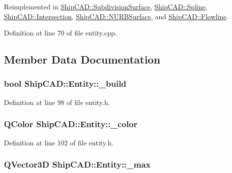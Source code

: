 Reimplemented in \hyperlink{classShipCAD_1_1SubdivisionSurface_aec5073750762d1f8c3ab2107a742f4a5}{Ship\-C\-A\-D\-::\-Subdivision\-Surface}, \hyperlink{classShipCAD_1_1Spline_a6e932411f0f4463514f80011c58f5e6a}{Ship\-C\-A\-D\-::\-Spline}, \hyperlink{classShipCAD_1_1Intersection_a2b496f9ab21c5fc4a7b97a665b24f2b1}{Ship\-C\-A\-D\-::\-Intersection}, \hyperlink{classShipCAD_1_1NURBSurface_aa6fc3d060087593349ce1b5119419433}{Ship\-C\-A\-D\-::\-N\-U\-R\-B\-Surface}, and \hyperlink{classShipCAD_1_1Flowline_ad148400a3e53b2368b37c2c7f50ec1b7}{Ship\-C\-A\-D\-::\-Flowline}.



Definition at line 70 of file entity.\-cpp.



\subsection{Member Data Documentation}
\hypertarget{classShipCAD_1_1Entity_a752e3eb309111a7457783e0fdab3d6fe}{
\subsubsection[{\-\_\-build}]{\setlength{\rightskip}{0pt plus 5cm}bool Ship\-C\-A\-D\-::\-Entity\-::\-\_\-build\hspace{0.3cm}{\ttfamily [protected]}}}\label{classShipCAD_1_1Entity_a752e3eb309111a7457783e0fdab3d6fe}


Definition at line 98 of file entity.\-h.

\hypertarget{classShipCAD_1_1Entity_a150a19aa958886e9dcf7c4e0e51dcd98}{
\subsubsection[{\-\_\-color}]{\setlength{\rightskip}{0pt plus 5cm}Q\-Color Ship\-C\-A\-D\-::\-Entity\-::\-\_\-color\hspace{0.3cm}{\ttfamily [protected]}}}\label{classShipCAD_1_1Entity_a150a19aa958886e9dcf7c4e0e51dcd98}


Definition at line 102 of file entity.\-h.

\hypertarget{classShipCAD_1_1Entity_a30e4f9cb421987cebd07737a554275eb}{
\subsubsection[{\-\_\-max}]{\setlength{\rightskip}{0pt plus 5cm}Q\-Vector3\-D Ship\-C\-A\-D\-::\-Entity\-::\-\_\-max\hspace{0.3cm}{\ttfamily [protected]}}}\label{classShipCAD_1_1Entity_a30e4f9cb421987cebd07737a554275eb}


